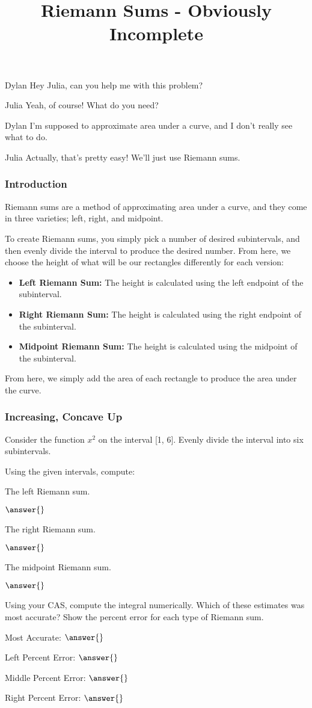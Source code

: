 \documentclass{ximera}
\title{Riemann Sums - Obviously Incomplete}
\begin{document}
\maketitle
\begin{dialogue}
\item[Dylan] Hey Julia, can you help me with this problem?
\item[Julia] Yeah, of course! What do you need?
\item[Dylan] I'm supposed to approximate area under a curve, and I don't really see what to do.
\item[Julia] Actually, that's pretty easy! We'll just use Riemann sums.
\end{dialogue}

\subsubsection{Introduction}
Riemann sums are a method of approximating area under a curve, and they come in three varieties; left, right, and midpoint.

To create Riemann sums, you simply pick a number of desired subintervals, and then evenly divide the interval to produce the desired number. From here, we choose the height of what will be our rectangles differently for each version:
\begin{itemize}
\item{\textbf{Left Riemann Sum:} The height is calculated using the left endpoint of the subinterval.}
\item{\textbf{Right Riemann Sum:} The height is calculated using the right endpoint of the subinterval.}
\item{\textbf{Midpoint Riemann Sum:} The height is calculated using the midpoint of the subinterval.}
\end{itemize}

From here, we simply add the area of each rectangle to produce the area under the curve.

\subsubsection{Increasing, Concave Up}
Consider the function $x^2$ on the interval [1, 6]. Evenly divide the interval into six subintervals.
\begin{question}
Using the given intervals, compute:

The left Riemann sum.

$\answer{}$

The right Riemann sum.

$\answer{}$

The midpoint Riemann sum.

$\answer{}$

Using your CAS, compute the integral numerically. Which of these estimates was most accurate? Show the percent error for each type of Riemann sum.

Most Accurate: $\answer{}$

Left Percent Error: $\answer{}$

Middle Percent Error: $\answer{}$

Right Percent Error: $\answer{}$
\end{question}
\end{document}
